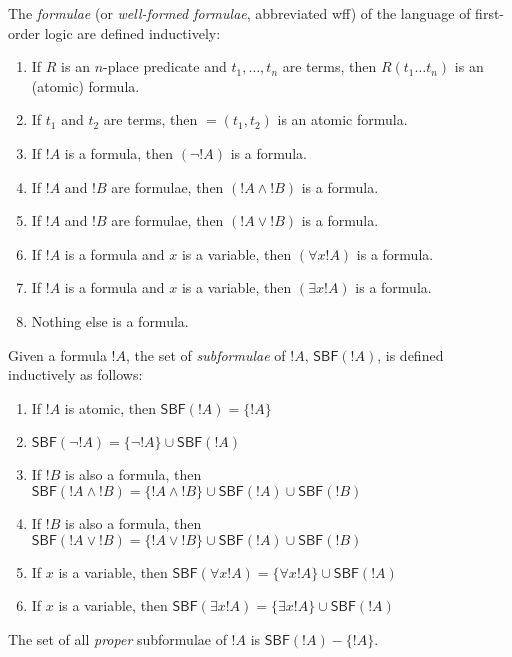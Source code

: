 \documentclass[syntax-and-semantics]{subfiles}
\begin{document}
\begin{defn}[Formula]
The \emph{formulae} (or \emph{well-formed formulae}, abbreviated wff) of the language of first-order logic are defined inductively:
\begin{enumerate}
\item If $R$ is an $n$-place predicate and $t_1,\ldots,t_n$ are terms, then $R(t_1\ldots t_n)$ is an (atomic) formula.
\item If $t_1$ and $t_2$ are terms, then $=(t_1,t_2)$ is an atomic formula.
\item If $!A$ is a formula, then $(\lnot !A)$ is a formula.
\item If $!A$ and $!B$ are formulae, then $(!A \land !B)$ is a formula.
\item If $!A$ and $!B$ are formulae, then $(!A \lor !B)$ is a formula.
\item If $!A$ is a formula and $x$ is a variable, then $(\forall x !A)$ is a formula.
\item If $!A$ is a formula and $x$ is a variable, then $(\exists x !A)$ is a formula.
\item Nothing else is a formula.
\end{enumerate}
\end{defn}


\begin{defn}[Subformula]
Given a formula $!A$, the set of \emph{subformulae} of $!A$, $\mathsf{SBF}(!A)$, is defined inductively as follows:
\begin{enumerate}
\item If $!A$ is atomic, then $\mathsf{SBF}(!A)=\{!A\}$
\item $\mathsf{SBF}(\lnot !A) = \{\lnot !A\} \cup \mathsf{SBF}(!A)$
\item If $!B$ is also a formula, then $\mathsf{SBF}(!A \land !B) = \{!A \land !B\} \cup \mathsf{SBF}(!A) \cup \mathsf{SBF}(!B)$
\item If $!B$ is also a formula, then $\mathsf{SBF}(!A \lor !B) = \{!A \lor !B\} \cup \mathsf{SBF}(!A) \cup \mathsf{SBF}(!B)$
\item If $x$ is a variable, then $\mathsf{SBF}(\forall x !A) = \{\forall x !A\} \cup \mathsf{SBF}(!A)$
\item If $x$ is a variable, then $\mathsf{SBF}(\exists x !A) = \{\exists x !A\} \cup \mathsf{SBF}(!A)$
\end{enumerate}
The set of all \emph{proper} subformulae of $!A$ is $\mathsf{SBF}(!A) - \{!A\}$.
\end{defn}
\end{document}
